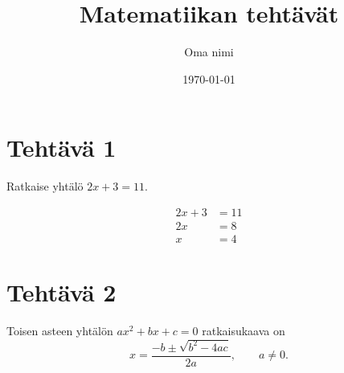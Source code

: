 \documentclass[a4paper,12pt]{article}
\title{Matematiikan tehtävät}
\author{Oma nimi}
\date{\today}
\begin{document}
\maketitle

\section*{Tehtävä 1}
Ratkaise yhtälö $2x + 3 = 11$.

\begin{align*}
  2x + 3 &= 11 \\
  2x &= 8 \\
  x &= 4
\end{align*}

\section*{Tehtävä 2}
Toisen asteen yhtälön $ax^2 + bx + c = 0$ ratkaisukaava on
\[
  x = \frac{-b \pm \sqrt{b^2 - 4ac}}{2a}, \qquad a \ne 0.
\]

\end{document}
